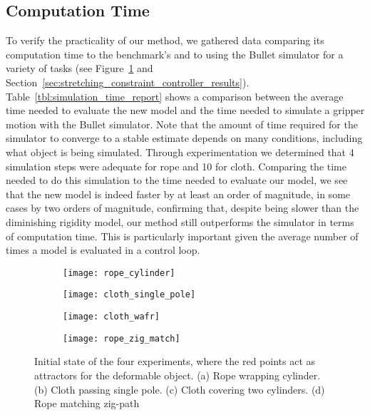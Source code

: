 \FloatBarrier

\subsection{Computation Time}

To verify the practicality of our method, we gathered data comparing its computation time to the benchmark's and to using the Bullet simulator for a variety of tasks (see Figure~\ref{fig:modelling_timing_tests} and Section~\ref{sec:stretching_constraint_controller_results}). Table~\ref{tbl:simulation_time_report} shows a comparison between the average time needed to evaluate the new model and the time needed to simulate a gripper motion with the Bullet simulator. Note that the amount of time required for the simulator to converge to a stable estimate depends on many conditions, including what object is being simulated. Through experimentation we determined that 4 simulation steps were adequate for rope and 10 for cloth. Comparing the time needed to do this simulation to the time needed to evaluate our model, we see that the new model is indeed faster by at least an order of magnitude, in some cases by two orders of magnitude, confirming that, despite being slower than the diminishing rigidity model, our method still outperforms the simulator in terms of computation time. This is particularly important given the average number of times a model is evaluated in a control loop.

\begin{figure}[h]
    \centering
    \begin{subfigure}{0.248\textwidth}
        \centering
        \texttt{[image: rope\_cylinder]}%
        \caption{}
    \end{subfigure}\hfill
    \begin{subfigure}{0.248\textwidth}
        \centering
        \texttt{[image: cloth\_single\_pole]}%
        \caption{}
    \end{subfigure}\hfill
    \begin{subfigure}{0.248\textwidth}
        \centering
        \texttt{[image: cloth\_wafr]}%
        \caption{}
    \end{subfigure}\hfill
    \begin{subfigure}{0.248\textwidth}
        \centering
        \texttt{[image: rope\_zig\_match]}%
        \caption{}
    \end{subfigure}%
    \caption{Initial state of the four experiments, where the red points act as attractors for the deformable object. (a) Rope wrapping cylinder. (b) Cloth passing single pole. (c) Cloth covering two cylinders. (d) Rope matching zig-path}
    \label{fig:modelling_timing_tests}
\end{figure}

